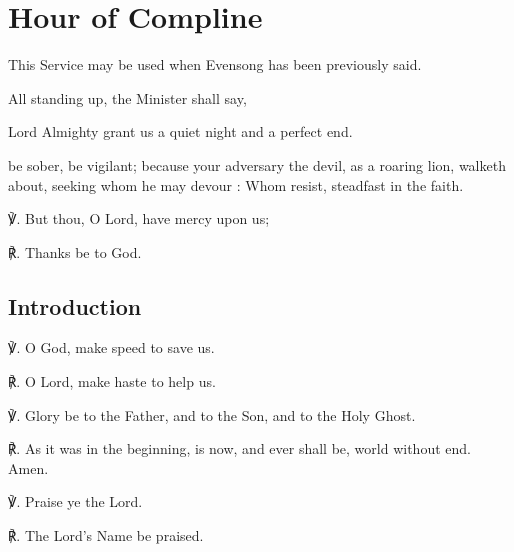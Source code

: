 \fancyhead[RE,LO]{}
\section{Hour of Compline}
\begin{secrubric}
This Service may be used when Evensong has been previously said.
\end{secrubric}
\begin{secrubric}
    All standing up, the Minister shall say,
\end{secrubric}

\begin{multicols}{2}
	
 Lord Almighty grant us a quiet night and a perfect end.\par
{}

 be sober, be vigilant; because your adversary the devil, as a roaring lion, walketh about, seeking whom he may devour : Whom resist, steadfast in the faith.

℣. But thou, O Lord, have mercy upon us;

℟. Thanks be to God.

\subsection{Introduction}
℣. O God, {} make speed to save us.

℟. O Lord, make haste to help us.

℣. Glory be to the Father, and to the Son, and to the Holy Ghost.

℟. As it was in the beginning, is now, and ever shall be, world without end. Amen.

℣. Praise ye the Lord.

℟. The Lord's Name be praised.


\end{multicols}
